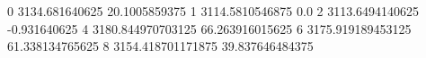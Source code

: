 0 3134.681640625 20.1005859375
1 3114.5810546875 0.0
2 3113.6494140625 -0.931640625
4 3180.844970703125 66.263916015625
6 3175.919189453125 61.338134765625
8 3154.418701171875 39.837646484375
